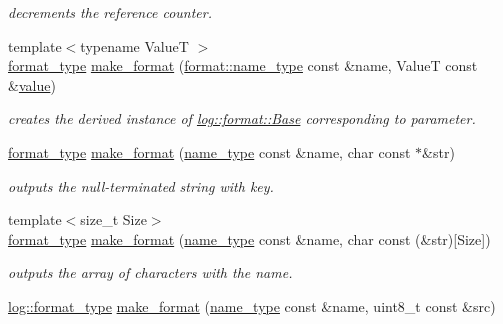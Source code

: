 \begin{DoxyCompactItemize}
\begin{DoxyCompactList}\small\item\em decrements the reference counter. \end{DoxyCompactList}\item 
{\footnotesize template$<$typename Value\-T $>$ }\\\hyperlink{namespacehryky_1_1log_ad50448c3f934f1eacd5c1bcffe8111e1}{format\-\_\-type} \hyperlink{namespacehryky_1_1log_1_1format_ae8ca636c4b89fe300287aca4f870f2ef}{make\-\_\-format} (\hyperlink{namespacehryky_1_1log_1_1format_ab7408d1e2ed2d648dbf9bba69eb74288}{format\-::name\-\_\-type} const \&name, Value\-T const \&\hyperlink{namespacehryky_1_1log_1_1format_a5b9af9c1a7b018d54144acfb1b8cc960}{value})
\begin{DoxyCompactList}\small\item\em creates the derived instance of \hyperlink{classhryky_1_1log_1_1format_1_1_base}{log\-::format\-::\-Base} corresponding to parameter. \end{DoxyCompactList}\item 
\hyperlink{namespacehryky_1_1log_ad50448c3f934f1eacd5c1bcffe8111e1}{format\-\_\-type} \hyperlink{namespacehryky_1_1log_1_1format_af9b4a13bd0f7d9d1f4d7d78dc89b3f86}{make\-\_\-format} (\hyperlink{namespacehryky_1_1log_1_1format_ab7408d1e2ed2d648dbf9bba69eb74288}{name\-\_\-type} const \&name, char const $\ast$\&str)
\begin{DoxyCompactList}\small\item\em outputs the null-\/terminated string with key. \end{DoxyCompactList}\item 
{\footnotesize template$<$size\-\_\-t Size$>$ }\\\hyperlink{namespacehryky_1_1log_ad50448c3f934f1eacd5c1bcffe8111e1}{format\-\_\-type} \hyperlink{namespacehryky_1_1log_1_1format_a89c05d378c57d3cec50c5ec4f5caad83}{make\-\_\-format} (\hyperlink{namespacehryky_1_1log_1_1format_ab7408d1e2ed2d648dbf9bba69eb74288}{name\-\_\-type} const \&name, char const (\&str)\mbox{[}Size\mbox{]})
\begin{DoxyCompactList}\small\item\em outputs the array of characters with the name. \end{DoxyCompactList}\item 
\hyperlink{namespacehryky_1_1log_ad50448c3f934f1eacd5c1bcffe8111e1}{log\-::format\-\_\-type} \hyperlink{namespacehryky_1_1log_1_1format_a895dc702169c64d14d10a8bb605aa812}{make\-\_\-format} (\hyperlink{namespacehryky_1_1log_1_1format_ab7408d1e2ed2d648dbf9bba69eb74288}{name\-\_\-type} const \&name, uint8\-\_\-t const \&src)

\end{DoxyCompactItemize}
